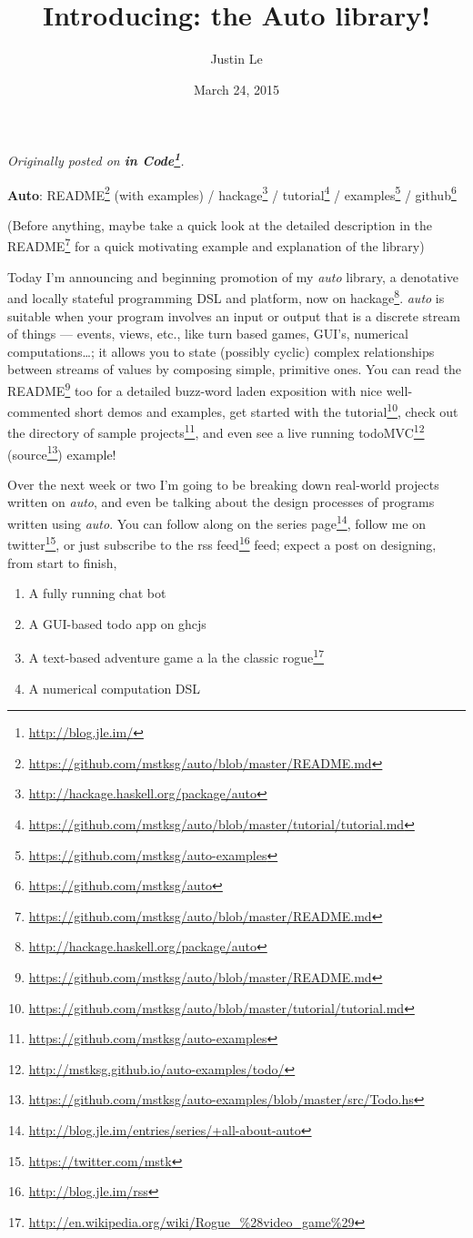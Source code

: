 \documentclass[]{article}
\title{Introducing: the Auto library!}
\author{Justin Le}
\date{March 24, 2015}
\renewcommand{\href}[2]{#2\footnote{\url{#1}}}
\begin{document}
\maketitle

\emph{Originally posted on \textbf{\href{http://blog.jle.im/}{in
Code}}.}

\textbf{Auto}:
\href{https://github.com/mstksg/auto/blob/master/README.md}{README}
(with examples) /
\href{http://hackage.haskell.org/package/auto}{hackage} /
\href{https://github.com/mstksg/auto/blob/master/tutorial/tutorial.md}{tutorial}
/ \href{https://github.com/mstksg/auto-examples}{examples} /
\href{https://github.com/mstksg/auto}{github}

(Before anything, maybe take a quick look at the detailed description in
the \href{https://github.com/mstksg/auto/blob/master/README.md}{README}
for a quick motivating example and explanation of the library)

Today I'm announcing and beginning promotion of my \emph{auto} library,
a denotative and locally stateful programming DSL and platform, now
\href{http://hackage.haskell.org/package/auto}{on hackage}. \emph{auto}
is suitable when your program involves an input or output that is a
discrete stream of things --- events, views, etc., like turn based
games, GUI's, numerical computations\ldots{}; it allows you to state
(possibly cyclic) complex relationships between streams of values by
composing simple, primitive ones. You can read the
\href{https://github.com/mstksg/auto/blob/master/README.md}{README} too
for a detailed buzz-word laden exposition with nice well-commented short
demos and examples, get started with
\href{https://github.com/mstksg/auto/blob/master/tutorial/tutorial.md}{the
tutorial}, check out the directory of
\href{https://github.com/mstksg/auto-examples}{sample projects}, and
even see a live running
\href{http://mstksg.github.io/auto-examples/todo/}{todoMVC}
(\href{https://github.com/mstksg/auto-examples/blob/master/src/Todo.hs}{source})
example!

Over the next week or two I'm going to be breaking down real-world
projects written on \emph{auto}, and even be talking about the design
processes of programs written using \emph{auto}. You can follow along on
\href{http://blog.jle.im/entries/series/+all-about-auto}{the series
page}, follow me on \href{https://twitter.com/mstk}{twitter}, or just
subscribe to the \href{http://blog.jle.im/rss}{rss feed} feed; expect a
post on designing, from start to finish,

\begin{enumerate}
\def\labelenumi{\arabic{enumi}.}
\tightlist
\item
  A fully running chat bot
\item
  A GUI-based todo app on ghcjs
\item
  A text-based adventure game a la the classic
  \href{http://en.wikipedia.org/wiki/Rogue_\%28video_game\%29}{rogue}
\item
  A numerical computation DSL
\end{enumerate}
\end{document}
